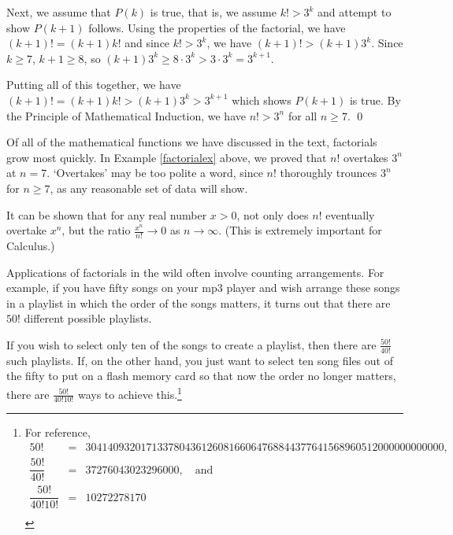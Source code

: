 \documentclass{ximera}
\begin{document}
\begin{example}
\begin{enumerate}
Next, we assume that $P(k)$ is true, that is, we assume $k! > 3^k$ and attempt to show $P(k+1)$ follows. Using the properties of the factorial, we have $(k+1)! = (k+1) k!$ and since $k! > 3^k$, we have $(k+1)! > (k+1) 3^{k}$.  Since $k \geq 7$, $k+1 \geq 8$, so $(k+1) 3^{k} \geq 8 \cdot 3^{k} > 3 \cdot 3^{k} = 3^{k+1}$.  

\smallskip

Putting all of this together, we have $(k+1)! = (k+1) k! > (k+1)3^{k} > 3^{k+1}$ which shows $P(k+1)$ is true.  By the Principle of Mathematical Induction, we have $n! > 3^{n}$ for all $n \geq 7$. \qed

\end{enumerate}

\end{example} 

Of all of the mathematical functions we have discussed in the text, factorials grow most quickly.  In  Example \ref{factorialex} above, we proved that $n!$ overtakes $3^{n}$ at $n=7$.  `Overtakes' may be too polite a word, since $n!$ thoroughly trounces $3^n$ for $n \geq 7$, as any reasonable set of data will show. 

\smallskip

It can be shown that for any real number $x > 0$, not only does $n!$ eventually overtake $x^n$, but the ratio $\frac{x^n}{n!} \rightarrow 0$ as $n \rightarrow \infty$. (This is extremely important for Calculus.)

\smallskip

Applications of factorials in the wild often involve counting arrangements. For example, if you have fifty songs on your mp3 player and wish arrange these songs in a playlist in which the order of the songs matters, it turns out that there are $50!$ different possible playlists. 

\smallskip

If you wish to select only ten of the songs to create a playlist, then there are $\frac{50!}{40!}$ such playlists.  If, on the other hand, you just want to select ten song files out of the fifty to put on a flash memory card so that now the order no longer matters, there are $\frac{50!}{40! 10!}$ ways to achieve this.\footnote{For reference, \[\begin{array}{ccl} 50! & = &  30414093201713378043612608166064768844377641568960512000000000000, \\  \dfrac{50!}{40!} & = & 37276043023296000, \quad \text{and} \\ [5pt] \dfrac{50!}{40!  10!} & = & 10272278170 \\ \end{array}\]} 
\end{document}
